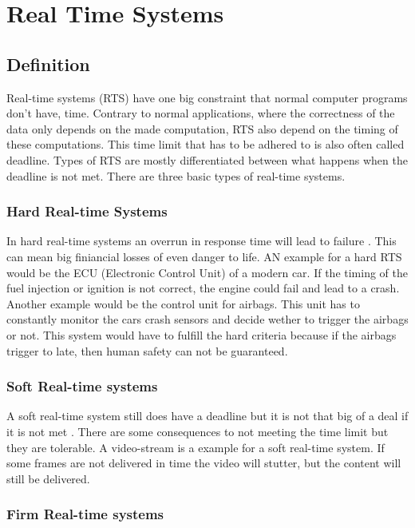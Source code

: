 \chapter{Real Time Systems}
\label{ch:realtimesystems}

\author{Nico Kratky}
%
\section{Definition}

Real-time systems (RTS) have one big constraint that normal computer programs don't have, time. Contrary to normal applications, where the correctness of the data only depends on the made computation, RTS also depend on the timing of these computations. This time limit that has to be adhered to is also often called deadline.
Types of RTS are mostly differentiated between what happens when the deadline is not met. There are three basic types of real-time systems.

\subsection{Hard Real-time Systems}

In hard real-time systems an overrun in response time will lead to failure \cite{RealTimeHermannKopetz}. This can mean big finiancial losses of even danger to life. AN example for a hard RTS would be the ECU (Electronic Control Unit) of a modern car. If the timing of the fuel injection or ignition is not correct, the engine could fail and lead to a crash. Another example would be the control unit for airbags. This unit has to constantly monitor the cars crash sensors and decide wether to trigger the airbags or not. This system would have to fulfill the hard criteria because if the airbags trigger to late, then human safety can not be guaranteed.

\subsection{Soft Real-time systems}

A soft real-time system still does have a deadline but it is not that big of a deal if it is not met \cite{RealTimeHermannKopetz}. There are some consequences to not meeting the time limit but they are tolerable. A video-stream is a example for a soft real-time system. If some frames are not delivered in time the video will stutter, but the content will still be delivered.

\subsection{Firm Real-time systems}

